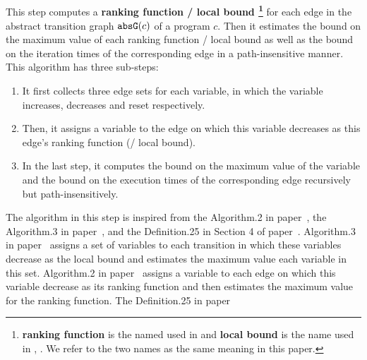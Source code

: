 \subsection{}
\label{sec:pathsensitive_rb-lbcompute}
This step computes a 
\textbf{ranking function / local bound
\footnote{\textbf{ranking function} is the named used in \cite{SinnZV14}
and \textbf{local bound} is the name used in \cite{ZulegerGSV11}, \cite{sinn2017complexity}.
We refer to the two names as the same meaning in this paper.}}
for each edge in the abstract transition graph $\mathtt{abs}{\mathtt{G}}(c)$ of a program $c$.
Then it estimates the bound on the maximum value of each ranking function / local bound as well as
the bound on the iteration times of the corresponding edge in a path-insensitive manner.
This algorithm has three sub-steps:
\begin{enumerate}
  \item It first collects three edge sets for each variable,
in which the variable increases, decreases and reset respectively.
\item
Then, it assigns a variable to the edge on which this variable decreases as this edge's ranking function 
(/ local bound).
\item
In the last step, it computes the bound on the maximum value of the variable and the bound on the execution
times of the corresponding edge recursively but path-insensitively.
\end{enumerate}
The algorithm in this step is inspired from the Algorithm.2 in paper~\cite{SinnZV14},
the Algorithm.3 in paper~\cite{ZulegerGSV11},
and the Definition.25 in Section 4 of paper~\cite{sinn2017complexity}.
Algorithm.3 in paper~\cite{ZulegerGSV11} assigns a set of variables to each transition in which these variables decrease as the local bound
and estimates the maximum value each variable in this set.
Algorithm.2 in paper~\cite{SinnZV14} assigns a variable to each edge on which this variable decrease as its ranking function
and then estimates the maximum value for the ranking function.
The Definition.25 in paper~\cite{sinn2017complexity}
